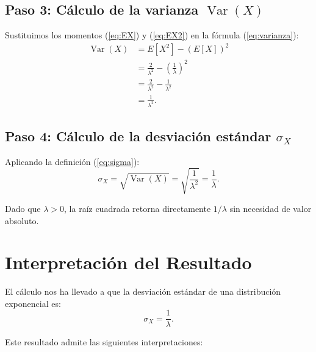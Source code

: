 \documentclass{article}
\theoremstyle{definition}
\begin{document}
    \subsection*{Paso 3: Cálculo de la varianza $\operatorname{Var}(X)$}

    Sustituimos los momentos (\ref{eq:EX}) y (\ref{eq:EX2}) en la fórmula (\ref{eq:varianza}):
    \begin{align*}
        \operatorname{Var}(X) &= E[X^2] - \left(E[X]\right)^2 \\[4pt]
                              &= \frac{2}{\lambda^2} - \left(\frac{1}{\lambda}\right)^2 \\[4pt]
                              &= \frac{2}{\lambda^2} - \frac{1}{\lambda^2} \\[4pt]
                              &= \frac{1}{\lambda^2}.
    \end{align*}

    \subsection*{Paso 4: Cálculo de la desviación estándar $\sigma_X$}

    Aplicando la definición (\ref{eq:sigma}):
    $$ \sigma_X = \sqrt{\operatorname{Var}(X)} = \sqrt{\frac{1}{\lambda^2}} = \frac{1}{\lambda}. $$

    Dado que $\lambda > 0$, la raíz cuadrada retorna directamente $1/\lambda$ sin necesidad de valor absoluto.

    \begin{flushright}
        \qedsymbol
    \end{flushright}

    \section*{Interpretación del Resultado}

    El cálculo nos ha llevado a que la desviación estándar de una distribución exponencial es:
    $$ \sigma_X = \frac{1}{\lambda}. $$

    Este resultado admite las siguientes interpretaciones:
\end{document}
